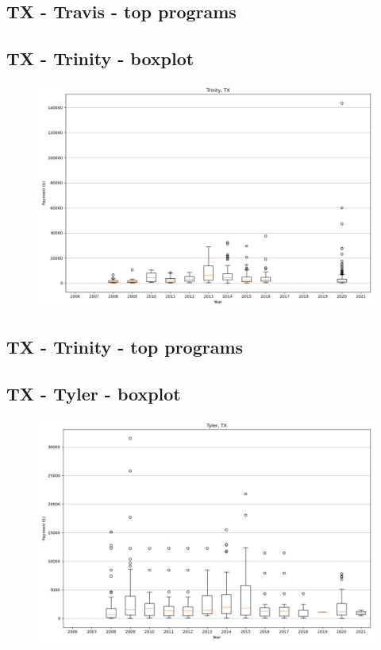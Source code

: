 \subsection*{TX - Travis - top programs}

\newpage
\subsection*{TX - Trinity - boxplot}
\begin{figure}[h]
\centering
\includegraphics[width=7in]{../output/boxplots/counties/Trinity-TX_boxplot.png}
\end{figure}


\subsection*{TX - Trinity - top programs}

\newpage
\subsection*{TX - Tyler - boxplot}
\begin{figure}[h]
\centering
\includegraphics[width=7in]{../output/boxplots/counties/Tyler-TX_boxplot.png}
\end{figure}


